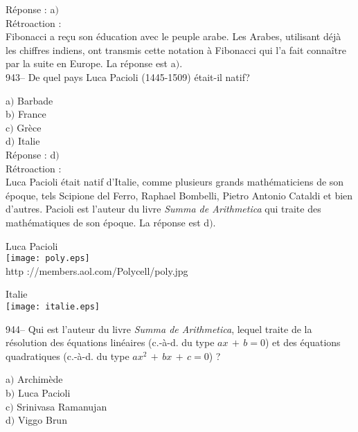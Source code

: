 ﻿\documentclass[letterpaper, 12pt]{article}
\begin{document}
R\'eponse : a$)$\\

R\'etroaction : \\
Fibonacci a re\c cu son \'education avec le peuple arabe. Les
Arabes, utilisant d\'ej\`a les chiffres indiens, ont transmis
cette notation \`a Fibonacci qui l'a fait conna\^itre par la suite en
Europe. La r\'eponse est a$)$.\\

943-- De quel pays Luca Pacioli (1445-1509) \'etait-il natif?

a$)$ Barbade \\
b$)$ France  \\
c$)$ Gr\`ece \\
d$)$ Italie \\

R\'eponse : d$)$\\

R\'etroaction :\\
Luca Pacioli \'etait natif d'Italie, comme plusieurs grands
math\'ematiciens de son \'epoque, tels Scipione del Ferro, Raphael
Bombelli, Pietro Antonio Cataldi et bien d'autres. Pacioli
est l'auteur du livre {\sl Summa de Arithmetica} qui traite des
math\'ematiques de son \'epoque. La r\'eponse est d$)$.\\

        \begin{center}
        Luca Pacioli\\
    \texttt{[image: poly.eps]}\\
        {\footnotesize http ://members.aol.com/Polycell/poly.jpg}
    \end{center}

        \begin{center}
        Italie\\
    \texttt{[image: italie.eps]}\\
    \end{center}

944-- Qui est l'auteur du livre {\sl Summa de Arithmetica}, lequel
traite de la r\'esolution des \'equations lin\'eaires (c.-\`a-d. du
type $ax\,+\,b=0$) et des \'equations quadratiques (c.-\`a-d. du
type $ax^2\,+\,bx\,+\,c=0$) ?

a$)$ Archim\`ede \\
b$)$ Luca Pacioli  \\
c$)$ Srinivasa Ramanujan \\
d$)$ Viggo Brun \\
\end{document}
